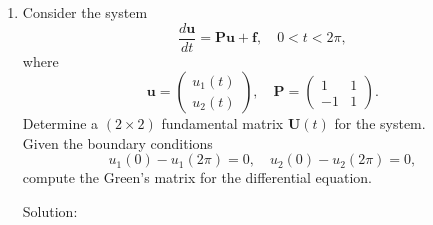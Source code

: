 \documentclass[12pt]{article}
\numberwithin{equation}{section}
\begin{document}
\begin{enumerate}
\begin{enumerate}
    \item Consider the system
    $$\frac{d\mathbf{u}}{dt}=\mathbf{Pu}+\mathbf{f},\quad 0<t<2\pi,$$
    where
    $$\mathbf{u}=\left(\begin{array}{c}u_1(t)\\u_2(t)\end{array}\right),\quad \mathbf{P}=\left(\begin{array}{cc}1&1\\-1&1\end{array}\right).$$
    Determine a $(2\times 2)$ fundamental matrix $\mathbf{U}(t)$ for the system.\\
    Given the boundary conditions
    $$u_1(0)-u_1(2\pi)=0,\quad u_2(0)-u_2(2\pi)=0,$$
    compute the Green's matrix for the differential equation.

    Solution:\\


\end{enumerate}
\end{enumerate}
\end{document}
